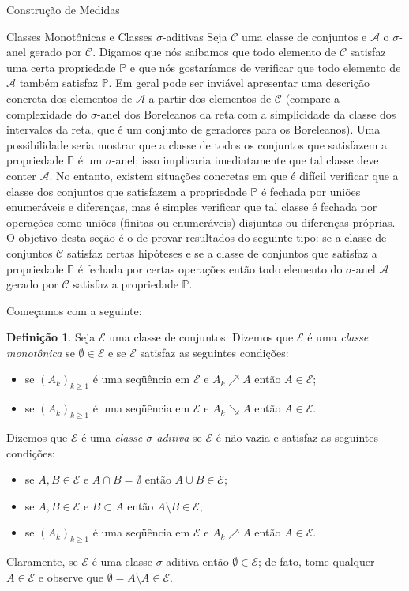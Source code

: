 \documentclass[oneside,final,11pt]{amsbook}
\theoremstyle{remark}\newtheorem{exercise}{Exercício}[chapter]
\theoremstyle{remark}\newtheorem{*exercise}[exercise]{\hbox to 0pt{\hskip 0pt minus 1fil*}Exercício}
\theoremstyle{definition}\newtheorem{exdefin}{Definição}[chapter]
\theoremstyle{plain}\newtheorem{teo}{Teorema}[section]
\theoremstyle{plain}\newtheorem{lem}[teo]{Lema}
\theoremstyle{plain}\newtheorem{prop}[teo]{Proposição}
\theoremstyle{plain}\newtheorem{cor}[teo]{Corolário}
\theoremstyle{definition}\newtheorem{defin}[teo]{Definição}
\theoremstyle{remark}\newtheorem{rem}[teo]{Observação}
\theoremstyle{definition}\newtheorem{notation}[teo]{Notação}
\theoremstyle{definition}\newtheorem{convention}[teo]{Convenção}
\theoremstyle{definition}\newtheorem{example}[teo]{Exemplo}
\numberwithin{section}{chapter}
\numberwithin{equation}{section}
\begin{document}
\begin{chapter}{Construção de Medidas}
\begin{section}{Classes Monotônicas e Classes ${\sigma}$-aditivas}
Seja $\mathcal C$ uma classe de conjuntos e $\mathcal A$ o $\sigma$-anel gerado por $\mathcal C$.
Digamos que nós saibamos que todo elemento de $\mathcal C$ satisfaz uma certa propriedade $\mathbb P$
e que nós gostaríamos de verificar que todo elemento de $\mathcal A$ também satisfaz $\mathbb P$.
Em geral pode ser inviável apresentar uma descrição concreta dos elementos de $\mathcal A$ a partir
dos elementos de $\mathcal C$ (compare a complexidade do $\sigma$-anel dos Boreleanos da reta com
a simplicidade da classe dos intervalos da reta, que é um conjunto de geradores para os Boreleanos).
Uma possibilidade seria mostrar que a classe de todos os conjuntos que satisfazem a propriedade $\mathbb P$ é um
$\sigma$-anel; isso implicaria imediatamente que tal classe deve conter $\mathcal A$. No entanto,
existem situações concretas em que é difícil verificar que a classe dos conjuntos que satisfazem a propriedade
$\mathbb P$ é fechada por uniões enumeráveis e diferenças, mas é simples verificar que tal classe é fechada por
operações como uniões (finitas ou enumeráveis) disjuntas ou diferenças próprias. O objetivo desta seção
é o de provar resultados do seguinte tipo: se a classe de conjuntos $\mathcal C$ satisfaz certas hipóteses
e se a classe de conjuntos que satisfaz a propriedade $\mathbb P$ é fechada por certas operações então
todo elemento do $\sigma$-anel $\mathcal A$ gerado por $\mathcal C$ satisfaz a propriedade $\mathbb P$.

Começamos com a seguinte:
\begin{defin}
Seja $\mathcal E$ uma classe de conjuntos. Dizemos que $\mathcal E$ é uma
{\em classe monotônica\/}
se $\emptyset\in\mathcal E$ e se $\mathcal E$ satisfaz as seguintes condições:
\begin{itemize}
\item se $(A_k)_{k\ge1}$ é uma seqüência em $\mathcal E$ e $A_k\nearrow A$ então $A\in\mathcal E$;
\item se $(A_k)_{k\ge1}$ é uma seqüência em $\mathcal E$ e $A_k\searrow A$ então $A\in\mathcal E$.
\end{itemize}
Dizemos que $\mathcal E$ é uma
{\em classe $\sigma$-aditiva\/}
se $\mathcal E$ é não vazia e satisfaz as seguintes condições:
\begin{itemize}
\item se $A,B\in\mathcal E$ e $A\cap B=\emptyset$ então $A\cup B\in\mathcal E$;
\item se $A,B\in\mathcal E$ e $B\subset A$ então $A\setminus B\in\mathcal E$;
\item se $(A_k)_{k\ge1}$ é uma seqüência em $\mathcal E$ e $A_k\nearrow A$ então $A\in\mathcal E$.
\end{itemize}
\end{defin}
Claramente, se $\mathcal E$ é uma classe $\sigma$-aditiva então $\emptyset\in\mathcal E$; de fato,
tome qualquer $A\in\mathcal E$ e observe que $\emptyset=A\setminus A\in\mathcal E$.


\end{section}
\end{chapter}
\end{document}
